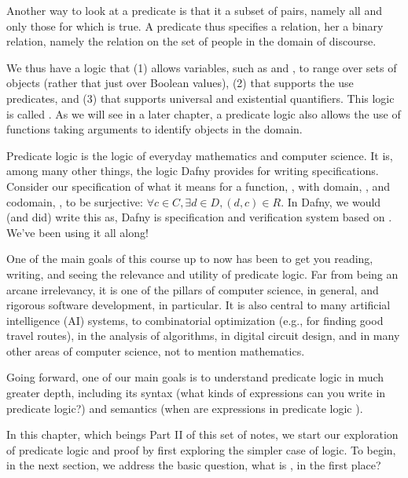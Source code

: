\documentclass[letterpaper,10pt,english]{sphinxmanual}
\begin{document}
Another way to look at a predicate is that it  a subset of
 pairs, namely all and only those for which  is
true. A predicate thus specifies a relation, her a binary relation,
namely the  relation on the set of people in the domain of
discourse.

We thus have a logic that (1) allows variables, such as  and ,
to range over sets of objects (rather that just over Boolean values),
(2) that supports the use predicates, and (3) that supports universal
and existential quantifiers. This logic is called .
As we will see in a later chapter, a predicate logic also allows the
use of functions taking arguments to identify objects in the domain.

Predicate logic is the logic of everyday mathematics and computer
science. It is, among many other things, the logic Dafny provides for
writing specifications.  Consider our specification of what it means
for a function, , with domain, , and codomain, , to be
surjective: \(\forall c \in C, \exists d \in D, (d,c) \in R\). In
Dafny, we would (and did) write this as,  Dafny is specification and
verification system based on . We’ve been using it
all along!

One of the main goals of this course up to now has been to get you
reading, writing, and seeing the relevance and utility of predicate
logic. Far from being an arcane irrelevancy, it is one of the pillars
of computer science, in general, and rigorous software development, in
particular. It is also central to many artificial intelligence (AI)
systems, to combinatorial optimization (e.g., for finding good travel
routes), in the analysis of algorithms, in digital circuit design, and
in many other areas of computer science, not to mention mathematics.

Going forward, one of our main goals is to understand predicate logic
in much greater depth, including its syntax (what kinds of expressions
can you write in predicate logic?) and semantics (when are expressions
in predicate logic ).

In this chapter, which beings Part II of this set of notes, we start
our exploration of predicate logic and proof by first exploring the
simpler case of  logic.  To begin, in the next section,
we address the basic question, what is , in the first place?
\end{document}
